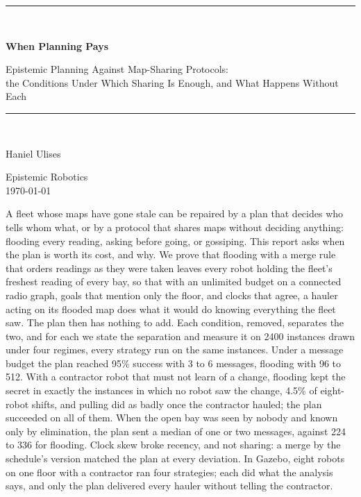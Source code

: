 \documentclass[11pt,a4paper]{article}
\theoremstyle{definition}
\begin{document}
\begin{titlepage}
\centering
\vspace*{2.4cm}
{\color{rulegrey}\rule{\textwidth}{0.8pt}}\\[0.9cm]
{\LARGE\bfseries When Planning Pays\par}
\vspace{0.5cm}
{\large\color{slate} Epistemic Planning Against Map-Sharing Protocols:\\
the Conditions Under Which Sharing Is Enough, and What Happens Without Each\par}
\vspace{0.7cm}
{\color{rulegrey}\rule{\textwidth}{0.8pt}}\\[1.4cm]

{\large Haniel Ulises\par}
\vspace{0.3cm}
{\color{slate} Epistemic Robotics}\\
\vspace{0.15cm}
{\color{slate}\today}

\vfill
{\color{slate}\small
A fleet whose maps have gone stale can be repaired by a plan that decides who
tells whom what, or by a protocol that shares maps without deciding anything:
flooding every reading, asking before going, or gossiping. This report asks when
the plan is worth its cost, and why. We prove that flooding with a merge rule
that orders readings as they were taken leaves every robot holding the fleet's
freshest reading of every bay, so that with an unlimited budget on a connected
radio graph, goals that mention only the floor, and clocks that agree, a hauler
acting on its flooded map does what it would do knowing everything the fleet
saw. The plan then has nothing to add. Each condition, removed, separates the two,
and for each we state the separation and measure it on 2400 instances drawn
under four regimes, every strategy run on the same instances. Under a message
budget the plan reached 95\% success with 3 to 6 messages, flooding with 96 to
512. With a contractor robot that must not learn of a change, flooding kept the
secret in exactly the instances in which no robot saw the change, 4.5\% of
eight-robot shifts, and pulling did as badly once the contractor hauled; the plan succeeded on
all of them. When the open bay was seen by nobody and known only by elimination,
the plan sent a median of one or two messages, against 224 to 336 for flooding.
Clock skew broke recency, and not sharing: a merge by the schedule's version
matched the plan at every deviation. In Gazebo, eight robots on one floor with a
contractor ran four strategies; each did what the analysis says, and only the plan
delivered every hauler without telling the contractor.}
\vspace{1.2cm}
\end{titlepage}
\end{document}
